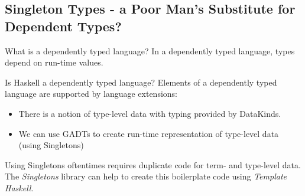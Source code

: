 \documentclass[
	aspectratio=169, %
	8pt, %
]{beamer}
\newenvironment{slide}[1]
  {\begin{frame}[fragile,environment=slide]{#1}}
  {\end{frame}}
\begin{document}
\subsection{Singleton Types - a Poor Man's Substitute for Dependent Types?}
\begin{slide}{\insertsubsection}
				\begin{definition}{What is a dependently typed language?}
								In a dependently typed language, types depend on run-time values.
				\end{definition}
				\begin{definition}{Is Haskell a dependently typed language?}
								Elements of a dependently typed language are supported by language extensions:
								\begin{itemize}
												\item{There is a  notion of type-level data with typing provided by DataKinds.}
												\item{We can use GADTs to create run-time representation of type-level data (using Singletons)}
								\end{itemize}
								Using Singletons oftentimes requires duplicate code for term- and type-level data. The \textit{Singletons} library can help to create this boilerplate code using \textit{Template Haskell}.
				\end{definition}
\end{slide}
\end{document}
